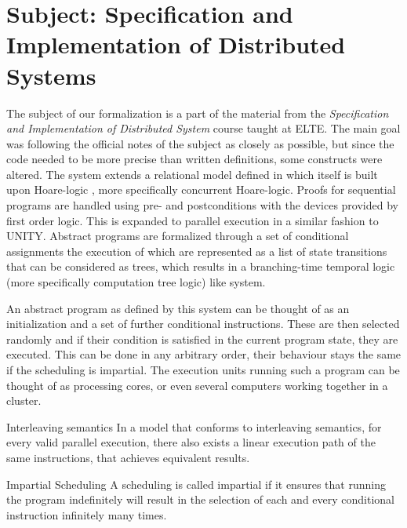 \section{Subject: Specification and Implementation of Distributed Systems}
\label{sec:subject}

The subject of our formalization is a part of the material from the \textit{Specification and Implementation of Distributed System} course taught at ELTE. The main goal was following the official notes of the subject\cite{hz-orsi} as closely as possible, but since the code needed to be more precise than written definitions, some constructs were altered. The system extends a relational model defined in \cite{fothi-prog} which itself is built upon Hoare-logic \cite{hoare1978proof}\cite{hoare-logic}, more specifically concurrent Hoare-logic\cite{Lamport1980}. Proofs for sequential programs are handled using pre- and postconditions with the devices provided by first order logic. This is expanded to parallel execution in a similar fashion to UNITY. Abstract programs are formalized through a set of conditional assignments the execution of which are represented as a list of state transitions that can be considered as trees, which results in a branching-time temporal logic \cite{emerson1988branching} (more specifically computation tree logic) like system.

An abstract program as defined by this system can be thought of as an initialization and a set of further conditional instructions. These are then selected randomly and if their condition is satisfied in the current program state, they are executed. This can be done in any arbitrary order, their behaviour stays the same if the scheduling is impartial. The execution units running such a program can be thought of as processing cores, or even several computers working together in a cluster.

\begin{definition}{Interleaving semantics}
\label{def:interleaving-semantics}
In a model that conforms to interleaving semantics, for every valid parallel execution, there also exists a linear execution path of the same instructions, that achieves equivalent results.
\end{definition}

\begin{definition}{Impartial Scheduling}
\label{def:impartial-scheduling}
A scheduling is called impartial if it ensures that running the program indefinitely will result in the selection of each and every conditional instruction infinitely many times.
\end{definition}

